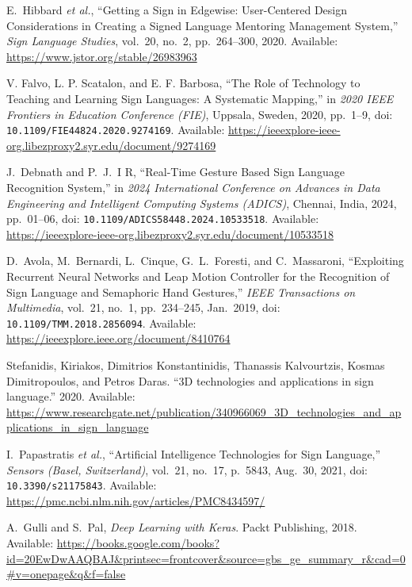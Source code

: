\documentclass[12pt]{article}
\begin{document}
\begin{thebibliography}{99}

E.~Hibbard \emph{et al.}, 
“Getting a Sign in Edgewise: User-Centered Design Considerations in Creating a Signed Language Mentoring Management System,” 
\emph{Sign Language Studies}, vol.~20, no.~2, pp.~264--300, 2020. 
Available: \url{https://www.jstor.org/stable/26983963}  

V. Falvo, L. P. Scatalon, and E. F. Barbosa, 
“The Role of Technology to Teaching and Learning Sign Languages: A Systematic Mapping,” 
in \emph{2020 IEEE Frontiers in Education Conference (FIE)}, Uppsala, Sweden, 2020, pp.~1--9, 
doi: \texttt{10.1109/FIE44824.2020.9274169}.  
Available: \url{https://ieeexplore-ieee-org.libezproxy2.syr.edu/document/9274169}

J.~Debnath and P.~J.~I R, 
“Real-Time Gesture Based Sign Language Recognition System,” 
in \emph{2024 International Conference on Advances in Data Engineering and Intelligent Computing Systems (ADICS)}, 
Chennai, India, 2024, pp.~01--06, 
doi: \texttt{10.1109/ADICS58448.2024.10533518}.
Available: \url{https://ieeexplore-ieee-org.libezproxy2.syr.edu/document/10533518}

D.~Avola, M.~Bernardi, L.~Cinque, G.~L.~Foresti, and C.~Massaroni, 
“Exploiting Recurrent Neural Networks and Leap Motion Controller for the Recognition of Sign Language and Semaphoric Hand Gestures,” 
\emph{IEEE Transactions on Multimedia}, vol.~21, no.~1, pp.~234--245, Jan.~2019, 
doi: \texttt{10.1109/TMM.2018.2856094}. 
Available: \url{https://ieeexplore.ieee.org/document/8410764}

Stefanidis, Kiriakos, Dimitrios Konstantinidis, Thanassis Kalvourtzis,  
Kosmas Dimitropoulos, and Petros Daras.  
“3D technologies and applications in sign language.” 2020. 
Available: \url{https://www.researchgate.net/publication/340966069_3D_technologies_and_applications_in_sign_language}

I.~Papastratis \emph{et al.}, 
“Artificial Intelligence Technologies for Sign Language,” 
\emph{Sensors (Basel, Switzerland)}, vol.~21, no.~17, p.~5843, Aug.~30, 2021, 
doi: \texttt{10.3390/s21175843}.   
Available: \url{https://pmc.ncbi.nlm.nih.gov/articles/PMC8434597/}

A.~Gulli and S.~Pal, 
\emph{Deep Learning with Keras}. 
Packt Publishing, 2018. 
Available: \url{https://books.google.com/books?id=20EwDwAAQBAJ&printsec=frontcover&source=gbs_ge_summary_r&cad=0#v=onepage&q&f=false}


\end{thebibliography}
\end{document}
